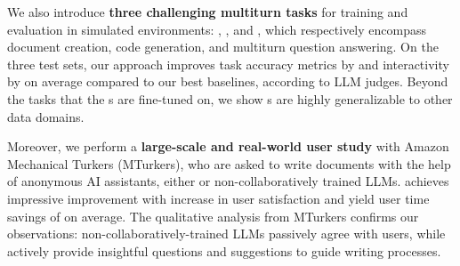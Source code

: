 We also introduce \textbf{three challenging multiturn tasks} for training and evaluation in simulated environments: \doct, \codet, and \mathct, which respectively encompass document creation, code generation, and multiturn question answering. 
On the three test sets, our approach improves task accuracy metrics by \taskimprov and interactivity by \itrimprov on average compared to our best baselines, according to LLM judges. Beyond the tasks that the \name{}s are fine-tuned on, we show \name{}s are highly generalizable to other data domains. 

Moreover, we perform a \textbf{large-scale and real-world user study} with \numturker{} Amazon Mechanical Turkers (MTurkers), who are asked to  write documents with the help of anonymous AI assistants, either \name{} or non-collaboratively trained LLMs. 
\name{} achieves impressive improvement with \realsatisfyimprov increase in user satisfaction and  yield user time savings of
\realtimeimprov{} on average. 
The qualitative analysis from MTurkers confirms our observations: non-collaboratively-trained LLMs passively agree with users, while \name{} actively provide insightful questions and suggestions to guide writing processes. 

